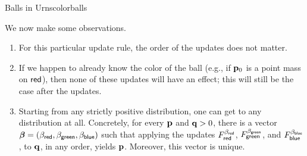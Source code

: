 \documentclass{article}
\begin{document}
\begin{examplex}{Balls in Urns}{colorballs}


    We now make some observations.
    \begin{enumerate}
        \item For this particular update rule, the order of the updates does not matter.
        \item If we happen to already know the color of the ball (e.g., if $\mathbf{p}_0$ is a point mass on ${\mathsf{red}}$), then none of these updates will have an effect; this will still be the case after the updates.
        \item Starting from any strictly positive distribution, one can get to any distribution at all.
        Concretely, for every $\mathbf{p}$ and $\mathbf{q} > 0$, there is a vector
        $\boldsymbol\beta
        = (\beta_{{\mathsf{red}}}, \beta_{{\mathsf{green}}}, \beta_{{\mathsf{blue}}})$
        such that applying the updates
        $F^{\beta_{{\mathsf{red}}}
            }_{{\mathsf{red}}}$,
        $F^{\beta_{{\mathsf{green}}}
            }_{{\mathsf{green}}}$, and
        $F^{\beta_{{\mathsf{blue}}}
            }_{{\mathsf{blue}}}$,
        to $\mathbf{q}$, in any order, yields $\mathbf{p}$. Moreover, this vector is unique.


    \end{enumerate}
    \end{examplex}
\end{document}
